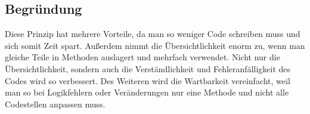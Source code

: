     \subsection{Begründung}
    Diese Prinzip hat mehrere Vorteile, da man so weniger Code schreiben muss und sich somit Zeit spart. Außerdem nimmt die Übersichtlichkeit enorm zu, wenn man gleiche Teile in Methoden auslagert und mehrfach verwendet. Nicht nur die Übersichtlichkeit, sondern auch die Verständlichkeit und Fehleranfälligkeit des Codes wird so verbessert. Des Weiteren wird die Wartbarkeit vereinfacht, weil man so bei Logikfehlern oder Veränderungen nur eine Methode und nicht alle Codestellen anpassen muss.
